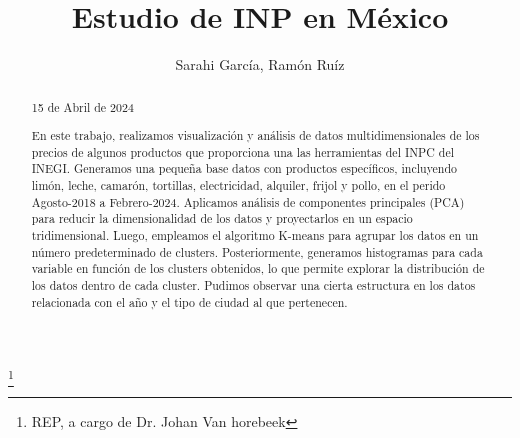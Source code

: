 \documentclass[letterpaper,spanish,reprint,nofootinbib,showkeys,aps]{revtex4-2}
\begin{document}
\title{\Large{\textbf{Estudio de INP en México}}}
\author{Sarahi García, Ramón Ruíz}
\thanks{REP, a  cargo de Dr. Johan Van horebeek}



\begin{abstract}
\begin{center}
\small{15 de Abril de 2024}
\end{center}
\vspace{0.6cm}


En este trabajo, realizamos visualización y análisis de datos multidimensionales de los precios de algunos productos que proporciona una las herramientas del INPC del INEGI. Generamos una pequeña base datos con productos específicos, incluyendo limón, leche, camarón, tortillas, electricidad, alquiler, frijol y pollo, en el perido Agosto-2018 a Febrero-2024. Aplicamos análisis de componentes principales (PCA) para reducir la dimensionalidad de los datos y proyectarlos en un espacio tridimensional. Luego, empleamos el algoritmo K-means para agrupar los datos en un número predeterminado de clusters. Posteriormente, generamos histogramas para cada variable en función de los clusters obtenidos, lo que permite explorar la distribución de los datos dentro de cada cluster. Pudimos observar una cierta estructura en los datos relacionada con el año y el tipo de ciudad al que pertenecen.


\end{abstract}

\maketitle

\end{document}
